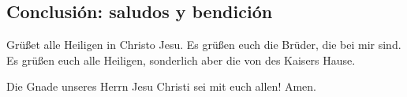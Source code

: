 \hypertarget{conclusiuxf3n-saludos-y-bendiciuxf3n}{%
\subsection{Conclusión: saludos y
bendición}\label{conclusiuxf3n-saludos-y-bendiciuxf3n}}

 Grüßet alle Heiligen in Christo Jesu. Es grüßen euch die
Brüder, die bei mir sind.  Es grüßen euch alle Heiligen,
sonderlich aber die von des Kaisers Hause.

 Die Gnade unseres Herrn Jesu Christi sei mit euch allen!
Amen.
